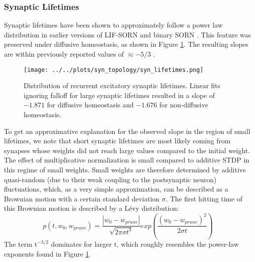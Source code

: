 \documentclass[10pt,a4paper]{article}
\begin{document}
\subsubsection{Synaptic Lifetimes}
Synaptic lifetimes have been shown to approximately follow a power law distribution in earlier versions of LIF-SORN and binary SORN \cite{SORN_Paper,Pengsheng_2013}. This feature was preserved under diffusive homeostasis, as shown in Figure \ref{Syn_Lifetimes}. The resulting slopes are within previously reported values of $\mathrm{\approx - 5/3}$ \cite{SORN_Paper}.
\begin{figure}
\texttt{[image: ../../plots/syn\_topology/syn\_lifetimes.png]}
\caption{Distribution of recurrent excitatory synaptic lifetimes. Linear fits ignoring falloff for large synaptic lifetimes resulted in a slope of $\mathrm{-1.871}$ for diffusive homeostasis and $\mathrm{-1.676}$ for non-diffusive homeostasis.}
\label{Syn_Lifetimes}
\end{figure}
To get an approximative explanation for the observed slope in the region of small lifetimes, we note that short synaptic lifetimes are most likely coming from synapses whose weights did not reach large values compared to the initial weight. The effect of multiplicative normalization is small compared to additive STDP in this regime of small weights. Small weights are therefore determined by additive quasi-random (due to their weak coupling to the postsynaptic neuron) fluctuations, which, as a very simple approximation, can be described as a Brownian motion with a certain standard deviation $\mathrm{\sigma}$. The first hitting time of this Brownian motion is described by a Lévy distribution:
\begin{equation}
p(t,w_0,w_{prune}) = \frac{|w_0-w_{prune}|}{\sqrt{2\pi \sigma t^3}}exp \left( \frac{(w_0-w_{prune})^2}{2\sigma t}\right)
\label{Levy_Dist}
\end{equation}
The term $\mathrm{t^{-3/2}}$ dominates for larger $\mathrm{t}$, which roughly resembles the power-law exponents found in Figure \ref{Syn_Lifetimes}.
\end{document}
